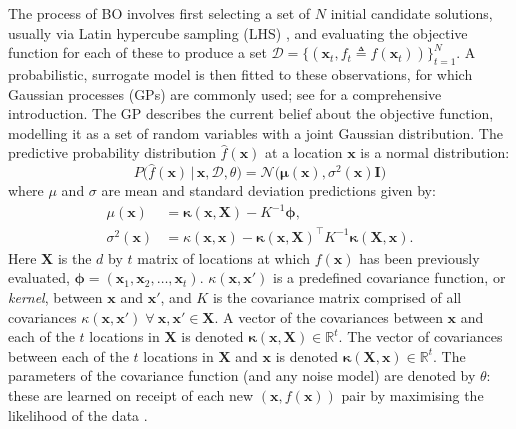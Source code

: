 \documentclass[conference]{IEEEtran}
\newcommand{\evaluatedx}{\bX}
\newcommand{\predict}{\hat{f}}
\newcommand{\ninitialevaluations}{N}
\newcommand{\nevaluations}{t}
\newcommand{\ndim}{d}
\newcommand\gp{GP\xspace}
\newcommand{\given}{\,|\,}
\newcommand{\bx}{\mathbf{x}}
\newcommand{\bX}{\mathbf{X}}
\newcommand{\bI}{\mathbf{I}}
\newcommand{\bmu}{\boldsymbol{\mu}}
\newcommand{\bphi}{\boldsymbol{\phi}}
\begin{document}
The process of BO %
involves first selecting a set of $\ninitialevaluations$ initial candidate solutions, usually via Latin hypercube sampling (LHS) \cite{mckay2000comparison}, and evaluating the objective function for each of these to produce a set $\mathcal{D} = \{ (\bx_t, f_t \triangleq f(\bx_t) )\}_{t=1}^{\ninitialevaluations}$.
A probabilistic, surrogate model is then fitted to these observations, for which  Gaussian processes ({\gp}s) are commonly used; see \cite{rasmussen2003gaussian} for a comprehensive introduction.
The \gp describes the current belief about the objective function, modelling it as a set of random variables with a joint Gaussian distribution.  The predictive probability distribution $\predict(\bx)$ at a location $\bx$ is a normal distribution:
\begin{equation}\label{eqn:predictive_probability_distribution}
P\big(\predict(\mathbf{x}) \given \mathbf{x}, \mathcal{D}, \theta \big) = 
\mathcal{N}\big(\bmu(\mathbf{x}), \sigma^2(\mathbf{x})\bI\big)
\end{equation}
where $\mu$ and $\sigma$ are mean and standard deviation predictions given by:
\begin{align}\label{eqn: mu}
\mu(\mathbf{x}) &= \boldsymbol{\kappa}(\mathbf{x}, \evaluatedx) - K^{-1}  \bphi,\\
\label{eqn: sigma}
\sigma^2(\mathbf{x}) &= \kappa(\mathbf{x}, \mathbf{x}) - \boldsymbol{\kappa}(\mathbf{x}, \evaluatedx)^{\top}K^{-1} \boldsymbol{\kappa}(\evaluatedx, \mathbf{x}).
\end{align}
Here $\evaluatedx$ is the $\ndim$ by $\nevaluations$ matrix of locations at which $f(\bx)$ has
been previously evaluated, $\bphi = (\bx_1, \bx_2, \ldots, \bx_{\nevaluations})$.
$\kappa(\mathbf{x}, \mathbf{x}')$ is a predefined
covariance function, or  \textit{kernel}, between $\mathbf{x}$ and
$\mathbf{x}'$, and  $K$ is the covariance matrix comprised of all
covariances $\kappa(\mathbf{x}, \mathbf{x}') \; \forall \: \mathbf{x},
\mathbf{x}'\in \evaluatedx$. A vector of the covariances between
$\mathbf{x}$ and each of the $t$ locations in $\evaluatedx$ is denoted
$\boldsymbol{\kappa}(\mathbf{x}, \evaluatedx)\in \mathbb{R}^{t}$. The vector of covariances between each of the $t$ locations in
$\evaluatedx$ and $\mathbf{x}$ is denoted $\boldsymbol{\kappa}(\evaluatedx,
\mathbf{x}) \in \mathbb{R}^{t}$. The parameters of the covariance function
(and any noise model) are denoted by $\theta$: these are learned on receipt of each new $(\bx, f(\bx))$ pair by maximising the likelihood of the data \cite{rasmussen2003gaussian}. 
\end{document}
